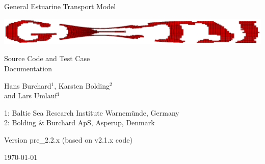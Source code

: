 \documentclass[a4paper,twoside]{article}
\begin{document}
\begin{titlepage}

\vfill

{\sf \bf \huge
 \begin{center}
   General Estuarine Transport Model
 \end{center}
}
\begin{center}
\includegraphics[width=\linewidth]{./figures/GETM2.ps}
\end{center}

\vspace{6mm}

{\sf \bf \LARGE
 \begin{center}
   Source Code and Test Case \\ Documentation
 \end{center}
}

{\sf \bf \LARGE
 \begin{center}
Hans Burchard$^{1}$, Karsten Bolding$^2$\\ and Lars Umlauf$^1$   
 \end{center}
}


\vspace{6mm}

{\sf \bf \Large
 \begin{center}
 1: Baltic Sea Research Institute Warnem\"unde, Germany \\
 2: Bolding \& Burchard ApS, Asperup, Denmark \\
 \end{center}
}


\vspace{5mm}

{\sf \bf \Large
 \begin{center}
  Version pre\_2.2.x (based on v2.1.x code)
 \end{center}
}

\vfill


{\sf \bf \Large
 \begin{center}
\today
 \end{center}
}

\vfill

\end{titlepage}


\cleardoublepage
\tableofcontents

\end{document}
